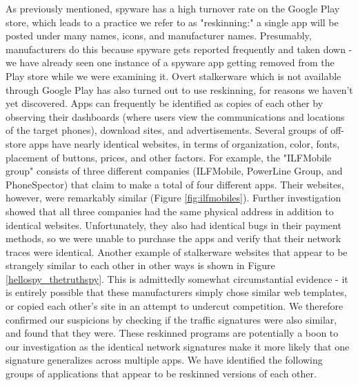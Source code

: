 \documentclass[acmtog]{acmart}
\begin{document}
As previously mentioned, spyware has a high turnover rate on the Google Play 
store, which leads to a practice we refer to as "reskinning:" a single app will 
be posted under many names, icons, and manufacturer names. Presumably, 
manufacturers do this because spyware gets reported frequently and taken down - 
we have already seen one instance of a spyware app getting removed from the 
Play store while we were examining it. Overt stalkerware which is not available 
through Google Play has also turned out to use reskinning, for reasons we 
haven't yet discovered. Apps can frequently be identified as copies of each 
other by observing their dashboards (where users view the communications and 
locations of the target phones), download sites, and advertisements. Several 
groups of off-store apps have nearly identical websites, in terms of 
organization, color, fonts, placement of buttons, prices, and other factors. 
For example, the "ILFMobile group" consists of three different companies 
(ILFMobile, PowerLine Group, and PhoneSpector) that claim to make a total of 
four different apps. Their websites, however, were remarkably similar (Figure 
\ref{fig:ilfmobiles}). Further investigation showed that all three companies 
had the same physical address in addition to identical websites. Unfortunately, 
they also had identical bugs in their payment methods, so we were unable to 
purchase the apps and verify that their network traces were identical. Another 
example of stalkerware websites that appear to be strangely similar to each 
other in other ways is shown in Figure \ref{hellospy_thetruthspy}. This is 
admittedly somewhat circumstantial evidence - it is entirely possible 
that these manufacturers simply chose similar web templates, or copied each 
other's site in an attempt to undercut competition. We therefore confirmed our 
suspicions by checking if the traffic signatures were also similar, and found 
that they were. These reskinned programs are potentially a boon to 
our investigation as the identical network signatures make it more likely that 
one signature generalizes across multiple apps. We have identified the 
following groups of applications that appear to be reskinned versions of each 
other.
\end{document}
